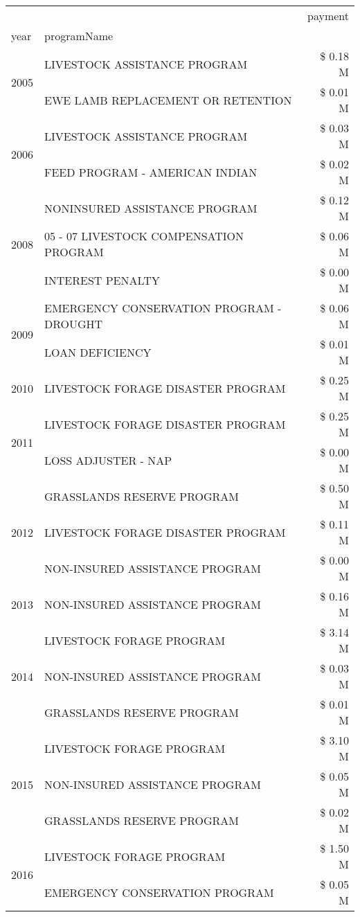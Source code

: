 \begin{tabular}{llr}
\toprule
 &  & payment \\
year & programName &  \\
\midrule
\multirow[t]{2}{*}{2005} & LIVESTOCK ASSISTANCE PROGRAM & \$ 0.18 M \\
 & EWE LAMB REPLACEMENT OR RETENTION & \$ 0.01 M \\
\cline{1-3}
\multirow[t]{2}{*}{2006} & LIVESTOCK ASSISTANCE PROGRAM & \$ 0.03 M \\
 & FEED PROGRAM - AMERICAN INDIAN & \$ 0.02 M \\
\cline{1-3}
\multirow[t]{3}{*}{2008} & NONINSURED ASSISTANCE PROGRAM & \$ 0.12 M \\
 & 05 - 07 LIVESTOCK COMPENSATION PROGRAM & \$ 0.06 M \\
 & INTEREST PENALTY & \$ 0.00 M \\
\cline{1-3}
\multirow[t]{2}{*}{2009} & EMERGENCY CONSERVATION PROGRAM - DROUGHT & \$ 0.06 M \\
 & LOAN DEFICIENCY & \$ 0.01 M \\
\cline{1-3}
2010 & LIVESTOCK FORAGE DISASTER PROGRAM & \$ 0.25 M \\
\cline{1-3}
\multirow[t]{2}{*}{2011} & LIVESTOCK FORAGE DISASTER PROGRAM & \$ 0.25 M \\
 & LOSS ADJUSTER - NAP & \$ 0.00 M \\
\cline{1-3}
\multirow[t]{3}{*}{2012} & GRASSLANDS RESERVE PROGRAM & \$ 0.50 M \\
 & LIVESTOCK FORAGE DISASTER PROGRAM & \$ 0.11 M \\
 & NON-INSURED ASSISTANCE PROGRAM & \$ 0.00 M \\
\cline{1-3}
2013 & NON-INSURED ASSISTANCE PROGRAM & \$ 0.16 M \\
\cline{1-3}
\multirow[t]{3}{*}{2014} & LIVESTOCK FORAGE PROGRAM & \$ 3.14 M \\
 & NON-INSURED ASSISTANCE PROGRAM & \$ 0.03 M \\
 & GRASSLANDS RESERVE PROGRAM & \$ 0.01 M \\
\cline{1-3}
\multirow[t]{3}{*}{2015} & LIVESTOCK FORAGE PROGRAM & \$ 3.10 M \\
 & NON-INSURED ASSISTANCE PROGRAM & \$ 0.05 M \\
 & GRASSLANDS RESERVE PROGRAM & \$ 0.02 M \\
\cline{1-3}
\multirow[t]{3}{*}{2016} & LIVESTOCK FORAGE PROGRAM & \$ 1.50 M \\
 & EMERGENCY CONSERVATION PROGRAM & \$ 0.05 M \\

\end{tabular}
